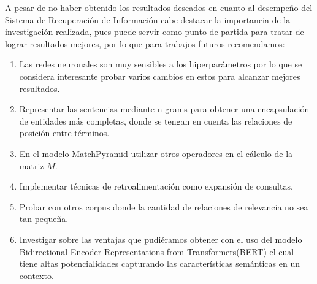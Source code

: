 \documentclass{llncs}
\begin{document}
 A pesar de no haber obtenido los resultados deseados en cuanto al desempeño del Sistema de Recuperación de Información cabe destacar  la importancia de la investigación realizada, pues puede servir como punto de partida para tratar de lograr resultados mejores, por lo que para trabajos futuros recomendamos:

\begin{enumerate}
	\item Las redes neuronales son muy sensibles a los hiperparámetros por lo que se considera interesante probar varios cambios en estos para alcanzar mejores resultados.
	\item Representar las sentencias mediante n-grams para obtener una encapsulación de entidades más completas, donde se tengan en cuenta las relaciones de posición entre términos.
	\item En el modelo MatchPyramid utilizar otros operadores en el cálculo de la matriz $M$.
	\item Implementar técnicas de retroalimentación como expansión de consultas. 
	\item Probar con otros corpus donde la cantidad de relaciones de relevancia no sea tan pequeña.
	\item Investigar sobre las ventajas que pudiéramos obtener con el uso del modelo Bidirectional Encoder Representations from Transformers(BERT) el cual tiene altas potencialidades capturando las características semánticas en un contexto.
\end{enumerate}
\end{document}
